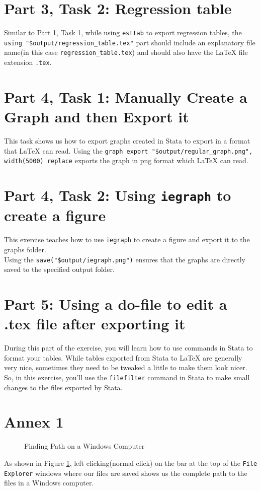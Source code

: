 \documentclass[]{article}
\begin{document}
\section*{Part 3, Task 2: Regression table}

Similar to Part 1, Task 1, while using \texttt{esttab} to export regression tables, the \verb|using "$output/regression_table.tex"| part should include an explanatory file name(in this case \texttt{regression\_table.tex}) and should also have the {\LaTeX} file extension \texttt{.tex}.

\section*{Part 4, Task 1: Manually Create a Graph and then Export it}

This task shows us how to export graphs created in Stata to export in a format that {\LaTeX} can read. Using the \verb|graph export "$output/regular_graph.png", width(5000) replace| 
exports the graph in png format which {\LaTeX} can read. 
\section*{Part 4, Task 2: Using \texttt{iegraph} to create a figure}
This exercise teaches how to use \texttt{iegraph} to create a figure and export it to the graphs folder. \\

Using the \verb|save("$output/iegraph.png")| ensures that the graphs are directly saved to the specified output folder. 

\section*{Part 5: Using a do-file to edit a .tex file after exporting it}

During this part of the exercise, you will learn how to use commands in Stata to format your tables. While tables exported from Stata to {\LaTeX} are generally very nice, sometimes they need to be tweaked a little to make them look nicer. So, in this exercise, you'll use the \texttt{filefilter} command in Stata to make small changes to the files exported by Stata. 

\newpage
\section*{Annex 1} {\label{annex1}}

\begin{figure}[H]
	\centering
	\caption{Finding Path on a Windows Computer}
	\label{fig:pathwin}
\end{figure}
As shown in Figure \ref{fig:pathwin}, left clicking(normal click) on the bar at the top of the \texttt{File Explorer} windows where our files are saved shows us the complete path to the files in a Windows computer. \\
\end{document}
